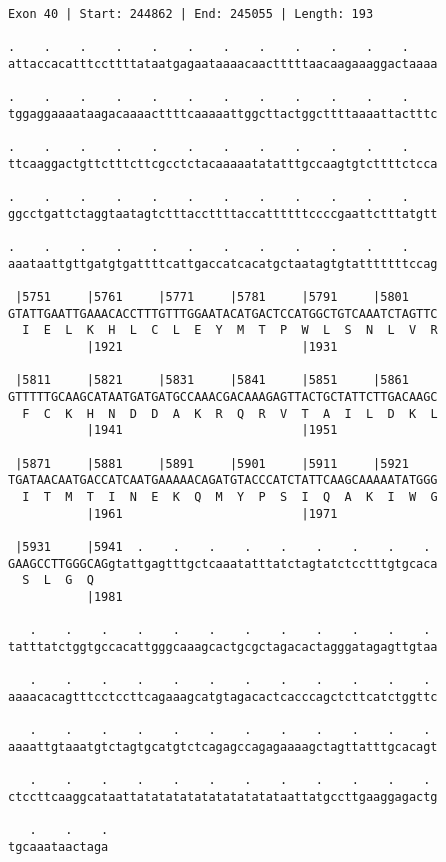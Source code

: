 \documentclass{article}
\begin{document}
\begin{Verbatim}
Exon 40 | Start: 244862 | End: 245055 | Length: 193
 
.    .    .    .    .    .    .    .    .    .    .    .    
attaccacatttccttttataatgagaataaaacaactttttaacaagaaaggactaaaa
  
.    .    .    .    .    .    .    .    .    .    .    .    
tggaggaaaataagacaaaacttttcaaaaattggcttactggcttttaaaattactttc
  
.    .    .    .    .    .    .    .    .    .    .    .    
ttcaaggactgttctttcttcgcctctacaaaaatatatttgccaagtgtcttttctcca
  
.    .    .    .    .    .    .    .    .    .    .    .    
ggcctgattctaggtaatagtctttaccttttaccattttttccccgaattctttatgtt
  
.    .    .    .    .    .    .    .    .    .    .    .    
aaataattgttgatgtgattttcattgaccatcacatgctaatagtgtatttttttccag
  
 |5751     |5761     |5771     |5781     |5791     |5801    
GTATTGAATTGAAACACCTTTGTTTGGAATACATGACTCCATGGCTGTCAAATCTAGTTC
  I  E  L  K  H  L  C  L  E  Y  M  T  P  W  L  S  N  L  V  R
           |1921                         |1931              
  
 |5811     |5821     |5831     |5841     |5851     |5861    
GTTTTTGCAAGCATAATGATGATGCCAAACGACAAAGAGTTACTGCTATTCTTGACAAGC
  F  C  K  H  N  D  D  A  K  R  Q  R  V  T  A  I  L  D  K  L
           |1941                         |1951              
  
 |5871     |5881     |5891     |5901     |5911     |5921    
TGATAACAATGACCATCAATGAAAAACAGATGTACCCATCTATTCAAGCAAAAATATGGG
  I  T  M  T  I  N  E  K  Q  M  Y  P  S  I  Q  A  K  I  W  G
           |1961                         |1971              
  
 |5931     |5941  .    .    .    .    .    .    .    .    . 
GAAGCCTTGGGCAGgtattgagtttgctcaaatatttatctagtatctcctttgtgcaca
  S  L  G  Q                                                
           |1981                                            
  
   .    .    .    .    .    .    .    .    .    .    .    . 
tatttatctggtgccacattgggcaaagcactgcgctagacactagggatagagttgtaa
  
   .    .    .    .    .    .    .    .    .    .    .    . 
aaaacacagtttcctccttcagaaagcatgtagacactcacccagctcttcatctggttc
  
   .    .    .    .    .    .    .    .    .    .    .    . 
aaaattgtaaatgtctagtgcatgtctcagagccagagaaaagctagttatttgcacagt
  
   .    .    .    .    .    .    .    .    .    .    .    . 
ctccttcaaggcataattatatatatatatatatatataattatgccttgaaggagactg
  
   .    .    .
tgcaaataactaga
\end{Verbatim}
\end{document}
